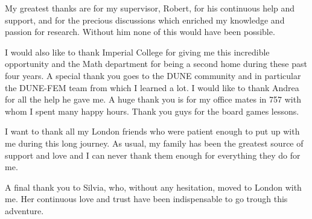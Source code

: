 My greatest thanks are for my supervisor, Robert, for his continuous help and
support, and for the precious discussions which enriched my knowledge and
passion for research. Without him none of this would have been possible.

I would also like to thank Imperial College for giving me this incredible
opportunity and the Math department for being a second home during these past
four years. A special thank you goes to the DUNE community and in particular the
DUNE-FEM team from which I learned a lot. I would like to thank Andrea for all
the help he gave me. A huge thank you is for my office mates in 757 with whom I
spent many happy hours. Thank you guys for the board games lessons.

I want to thank all my London friends who were patient enough to put up with
me during this long journey. As usual, my family has been the greatest source
of support and love and I can never thank them enough for everything they do
for me.

A final thank you to Silvia, who, without any hesitation, moved to London with
me. Her continuous love and trust have been indispensable to go trough this
adventure.